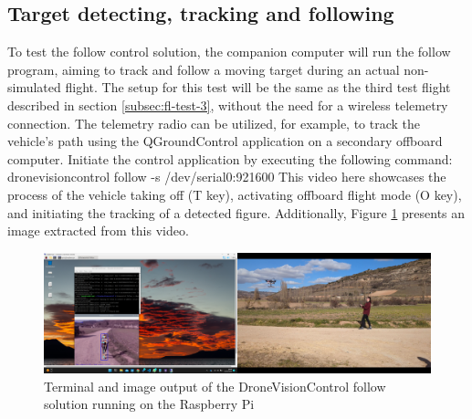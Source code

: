 \subsection{Target detecting, tracking and following}
\label{subsec:fl-test-5}


To test the follow control solution, the companion computer will run the follow program, aiming to track and follow a moving target during an actual non-simulated flight. The setup for this test will be the same as the third test flight described in section \ref{subsec:fl-test-3}, without the need for a wireless telemetry connection. The telemetry radio can be utilized, for example, to track the vehicle's path using the QGroundControl application on a secondary offboard computer. Initiate the control application by executing the following command:
dronevisioncontrol follow -s /dev/serial0:921600
This video here showcases the process of the vehicle taking off (T key), activating offboard flight mode (O key), and initiating the tracking of a detected figure. Additionally, Figure \ref{fig:flight-test-follow} presents an image extracted from this video.


\begin{figure}
  \centering
  \includegraphics[width=\textwidth, keepaspectratio]{img/video-field-test-follow.png}
  \caption{Terminal and image output of the DroneVisionControl follow solution running on the Raspberry Pi}
  \label{fig:flight-test-follow}
\end{figure}

